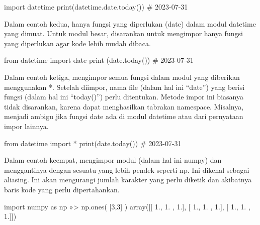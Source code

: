 \documentclass[
  letterpaper,
  DIV=11,
  numbers=noendperiod]{scrreprt}
\newenvironment{Shaded}{\begin{snugshade}}{\end{snugshade}}
\newcommand{\BuiltInTok}[1]{\textcolor[rgb]{0.00,0.23,0.31}{#1}}
\newcommand{\CommentTok}[1]{\textcolor[rgb]{0.37,0.37,0.37}{#1}}
\newcommand{\DecValTok}[1]{\textcolor[rgb]{0.68,0.00,0.00}{#1}}
\newcommand{\FloatTok}[1]{\textcolor[rgb]{0.68,0.00,0.00}{#1}}
\newcommand{\ImportTok}[1]{\textcolor[rgb]{0.00,0.46,0.62}{#1}}
\newcommand{\NormalTok}[1]{\textcolor[rgb]{0.00,0.23,0.31}{#1}}
\newcommand{\OperatorTok}[1]{\textcolor[rgb]{0.37,0.37,0.37}{#1}}
\begin{document}
\begin{Shaded}
\begin{Highlighting}[]
\ImportTok{import}\NormalTok{ datetime}
\BuiltInTok{print}\NormalTok{(datetime.date.today()) }\CommentTok{\# 2023{-}07{-}31}
\end{Highlighting}
\end{Shaded}

Dalam contoh kedua, hanya fungsi yang diperlukan (date) dalam modul
datetime yang dimuat. Untuk modul besar, disarankan untuk mengimpor
hanya fungsi yang diperlukan agar kode lebih mudah dibaca.

\begin{Shaded}
\begin{Highlighting}[]
\ImportTok{from}\NormalTok{ datetime }\ImportTok{import}\NormalTok{ date}
\BuiltInTok{print}\NormalTok{ (date.today()) }\CommentTok{\# 2023{-}07{-}31}
\end{Highlighting}
\end{Shaded}

Dalam contoh ketiga, mengimpor semua fungsi dalam modul yang diberikan
menggunakan *. Setelah diimpor, nama file (dalam hal ini ``date'') yang
berisi fungsi (dalam hal ini ``today()'') perlu ditentukan. Metode impor
ini biasanya tidak disarankan, karena dapat menghasilkan tabrakan
namespace. Misalnya, menjadi ambigu jika fungsi date ada di modul
datetime atau dari pernyataan impor lainnya.

\begin{Shaded}
\begin{Highlighting}[]
\ImportTok{from}\NormalTok{ datetime }\ImportTok{import} \OperatorTok{*} 
\BuiltInTok{print}\NormalTok{(date.today()) }\CommentTok{\# 2023{-}07{-}31}
\end{Highlighting}
\end{Shaded}

Dalam contoh keempat, mengimpor modul (dalam hal ini numpy) dan
menggantinya dengan sesuatu yang lebih pendek seperti np. Ini dikenal
sebagai aliasing. Ini akan mengurangi jumlah karakter yang perlu diketik
dan akibatnya baris kode yang perlu dipertahankan.

\begin{Shaded}
\begin{Highlighting}[]
\ImportTok{import}\NormalTok{ numpy }\ImportTok{as}\NormalTok{ np »}\OperatorTok{\textgreater{}}\NormalTok{ np.ones( [}\DecValTok{3}\NormalTok{,}\DecValTok{3}\NormalTok{] )}
\NormalTok{array([[ }\FloatTok{1.}\NormalTok{, }\FloatTok{1.}\NormalTok{ , }\FloatTok{1.}\NormalTok{],}
\NormalTok{           [ }\FloatTok{1.}\NormalTok{, }\FloatTok{1.}\NormalTok{ , }\FloatTok{1.}\NormalTok{],}
\NormalTok{           [ }\FloatTok{1.}\NormalTok{, }\FloatTok{1.}\NormalTok{ , }\FloatTok{1.}\NormalTok{]])  }
\end{Highlighting}
\end{Shaded}
\end{document}
